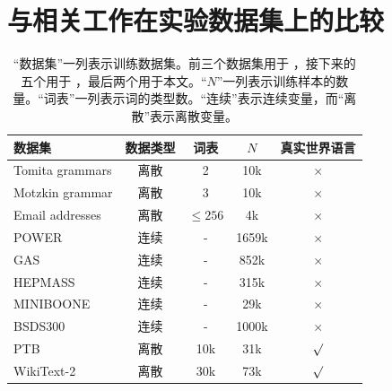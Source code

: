 \section{与相关工作在实验数据集上的比较}
\label{sec:datasets}
\begin{table}[t]
    \centering
    \begin{tabular}{l|c|c|c|c}
    \toprule
        数据集 & 数据类型 & 词表  & $N$ & 真实世界语言  \\
         \midrule
        Tomita grammars  \cite{tomita1982dynamic}  & 离散 & 2  & 10k & $\times$ \\
        Motzkin grammar \citep{alexander2021exact} & 离散 & 3 & 10k   &$\times$ \\
         Email addresses \citep{radev2008clair} & 离散 & $\leq 256$ & 4k & $\times$  \\
        \midrule
        POWER  \cite{Dua:2019} & 连续 & - & 1659k & $\times$ \\
        GAS \cite{fonollosa2015reservoir} & 连续 & - & 852k &  $\times$ \\
        HEPMASS \cite{baldi2016parameterized} & 连续 & - & 315k & $\times$  \\
        MINIBOONE \cite{roe2005boosted} & 连续 & -  & 29k & $\times$  \\
        BSDS300 \citep{martin2001database}  & 连续 & - & 1000k &  $\times$ \\

        \midrule
        PTB \citep{marcinkiewicz1994building} & 离散 & 10k  & 31k & $\surd$ \\
        WikiText-2  \citep{merity2016pointer} & 离散 & 30k & 73k &  $\surd$ \\

 \bottomrule
    \end{tabular}
    \caption{“数据集”一列表示训练数据集。前三个数据集用于 \citep{miller2021tensor}，接下来的五个用于 \cite{novikov2021tensor}，最后两个用于本文。“$N$”一列表示训练样本的数量。“词表”一列表示词的类型数。“连续”表示连续变量，而“离散”表示离散变量。}
    \label{tab:datasets}
\end{table}






